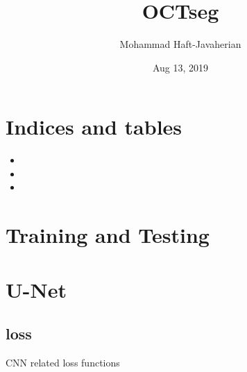 \documentclass[letterpaper,10pt,english]{sphinxmanual}
\title{OCTseg}
\date{Aug 13, 2019}
\author{Mohammad Haft-Javaherian}
\begin{document}
\pagestyle{empty}
\sphinxmaketitle
\pagestyle{plain}
\sphinxtableofcontents
\pagestyle{normal}
\label{\detokenize{index::doc}}



\chapter{Indices and tables}
\label{\detokenize{index:indices-and-tables}}\begin{itemize}
\item {} 

\item {} 

\item {} 

\end{itemize}


\chapter{Training and Testing}
\label{\detokenize{index:training-and-testing}}

\chapter{U-Net}
\label{\detokenize{index:u-net}}

\section{loss}
\label{\detokenize{index:module-unet.loss}}\label{\detokenize{index:loss}}
CNN related loss functions
\end{document}
